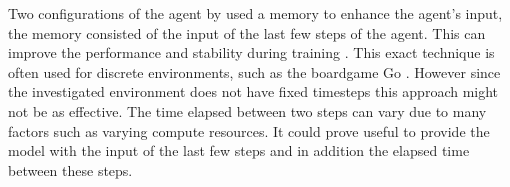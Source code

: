 Two configurations of the agent by \autocite{maximilian} used a memory to enhance the agent's input, the memory consisted of the input of the last few steps of the agent. This can improve the performance and stability during training \autocite{memory}.
This exact technique is often used for discrete environments, such as the boardgame Go \autocite{alphago}. However since the investigated environment does not have fixed timesteps this approach might not be as effective. The time elapsed between two steps can vary due to many factors such as varying compute resources. It could prove useful to provide the model with the input of the last few steps and in addition the elapsed time between these steps.















